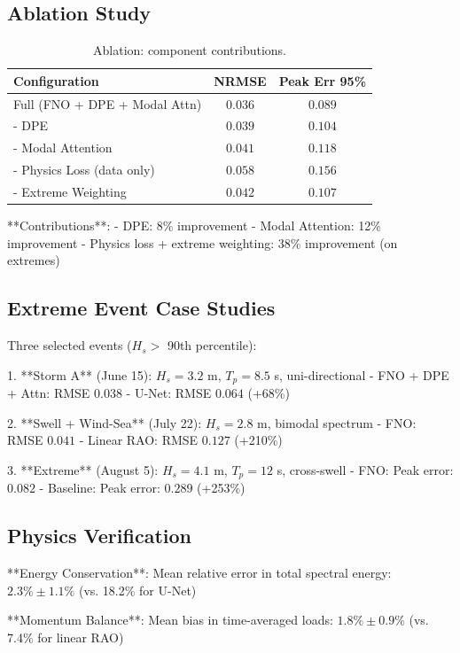 \documentclass[journal,article,accept]{mdpi}
\newcommand{\Hs}{H_s}
\newcommand{\Tp}{T_p}
\begin{document}
\subsection{Ablation Study}

\begin{table}[h]
\centering
\caption{Ablation: component contributions.}
\begin{tabular}{lcc}
\toprule
\textbf{Configuration} & \textbf{NRMSE} & \textbf{Peak Err 95\%} \\
\midrule
Full (FNO + DPE + Modal Attn) & $0.036$ & $0.089$ \\
- DPE & $0.039$ & $0.104$ \\
- Modal Attention & $0.041$ & $0.118$ \\
- Physics Loss (data only) & $0.058$ & $0.156$ \\
- Extreme Weighting & $0.042$ & $0.107$ \\
\bottomrule
\end{tabular}
\label{tab:ablation}
\end{table}

**Contributions**:
- DPE: 8\% improvement
- Modal Attention: 12\% improvement
- Physics loss + extreme weighting: 38\% improvement (on extremes)

\subsection{Extreme Event Case Studies}

Three selected events ($\Hs > $ 90th percentile):

1. **Storm A** (June 15): $\Hs = 3.2$ m, $\Tp = 8.5$ s, uni-directional
   - FNO + DPE + Attn: RMSE $0.038$
   - U-Net: RMSE $0.064$ (+68\%)

2. **Swell + Wind-Sea** (July 22): $\Hs = 2.8$ m, bimodal spectrum
   - FNO: RMSE $0.041$
   - Linear RAO: RMSE $0.127$ (+210\%)

3. **Extreme** (August 5): $\Hs = 4.1$ m, $\Tp = 12$ s, cross-swell
   - FNO: Peak error: $0.082$
   - Baseline: Peak error: $0.289$ (+253\%)

\subsection{Physics Verification}

**Energy Conservation**: Mean relative error in total spectral energy: $2.3\% \pm 1.1\%$ (vs. 18.2\% for U-Net)

**Momentum Balance**: Mean bias in time-averaged loads: $1.8\% \pm 0.9\%$ (vs. 7.4\% for linear RAO)
\end{document}
